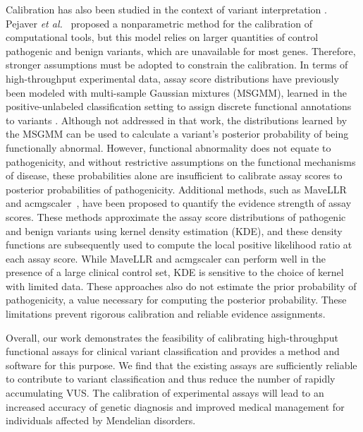 \documentclass[11pt]{article}
\theoremstyle{plain}
\begin{document}
Calibration has also been studied in the context of variant interpretation \cite{Benevenuta2021, zanti2023likelihood}. Pejaver \textit{et al.}~\cite{pejaver2022calibration} proposed a nonparametric method for the calibration of computational tools, but this model relies on larger quantities of control pathogenic and benign variants, which are unavailable for most genes. Therefore, stronger assumptions must be adopted to constrain the calibration. In terms of high-throughput experimental data, assay score distributions have previously been modeled with multi-sample Gaussian mixtures (MSGMM), learned in the positive-unlabeled classification setting to assign discrete functional annotations to variants \cite{Pejaver2019-fv}. Although not addressed in that work, the distributions learned by the MSGMM can be used to calculate a variant's posterior probability of being functionally abnormal. However, functional abnormality does not equate to pathogenicity, and without restrictive assumptions on the functional mechanisms of disease, these probabilities alone are insufficient to calibrate assay scores to posterior probabilities of pathogenicity. %
Additional methods, such as MaveLLR~\cite{van2023systematically} and acmgscaler~\cite{acmgscaler}, have been proposed to quantify the evidence strength of assay scores. These methods approximate the assay score distributions of pathogenic and benign variants using kernel density estimation (KDE), and these density functions are subsequently used to compute the local positive likelihood ratio at each assay score. While MaveLLR and acmgscaler can perform well in the presence of a large clinical control set, KDE is sensitive to the choice of kernel with limited data. These approaches also do not estimate the prior probability of pathogenicity, a value necessary for computing the posterior probability. These limitations prevent rigorous calibration and reliable evidence assignments.

Overall, our work demonstrates the feasibility of calibrating high-throughput functional assays for clinical variant classification and provides a method and software for this purpose. We find that the existing assays are sufficiently reliable to contribute to variant classification and thus reduce the number of rapidly accumulating VUS. The calibration of experimental assays %
will lead to an increased accuracy of genetic diagnosis and improved medical management for individuals affected by Mendelian disorders.
\end{document}
